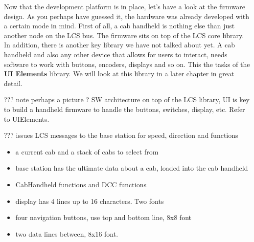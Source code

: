 
Now that the development platform is in place, let's have a look at the firmware design. As you perhaps have guessed it, the hardware was already developed with a certain mode in mind. First of all, a cab handheld is nothing else than just another node on the LCS bus. The firmware sits on top of the LCS core library. In addition, there is another key library we have not talked about yet. A cab handheld and also any other device that allows for users to interact, needs software to work with buttons, encoders, displays and so on. This the tasks of the \textbf{UI Elements } library. We will look at this library in a later chapter in great detail.

??? note perhaps a picture ? SW architecture on top of the LCS library, UI is key to build a handheld
firmware to handle the buttons, switches, display, etc. Refer to UIElements.

??? issues LCS messages to the base station for speed, direction and functions



\begin{itemize}
\item a current cab and a stack of cabs to select from
\item base station has the ultimate data about a cab, loaded into the cab handheld
\item CabHandheld functions and DCC functions
\end{itemize}


\begin{itemize}
\item display has 4 lines up to 16 characters. Two fonts
\item four navigation buttons, use top and bottom line, 8x8 font
\item two data lines between, 8x16 font.
\end{itemize}


